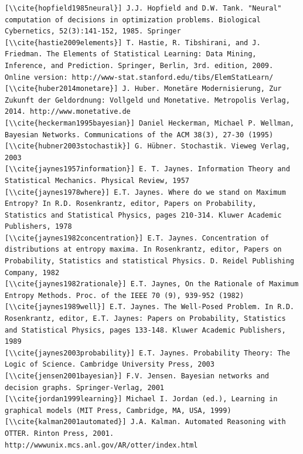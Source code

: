 \documentclass[10pt]{book}
\begin{document}
\begin{verbatim}
[\\cite{hopfield1985neural}] J.J. Hopfield and D.W. Tank. "Neural" computation of decisions in optimization problems. Biological Cybernetics, 52(3):141-152, 1985. Springer
[\\cite{hastie2009elements}] T. Hastie, R. Tibshirani, and J. Friedman. The Elements of Statistical Learning: Data Mining, Inference, and Prediction. Springer, Berlin, 3rd. edition, 2009. Online version: http://www-stat.stanford.edu/tibs/ElemStatLearn/
[\\cite{huber2014monetare}] J. Huber. Monetäre Modernisierung, Zur Zukunft der Geldordnung: Vollgeld und Monetative. Metropolis Verlag, 2014. http://www.monetative.de
[\\cite{heckerman1995bayesian}] Daniel Heckerman, Michael P. Wellman, Bayesian Networks. Communications of the ACM 38(3), 27-30 (1995)
[\\cite{hubner2003stochastik}] G. Hübner. Stochastik. Vieweg Verlag, 2003
[\\cite{jaynes1957information}] E. T. Jaynes. Information Theory and Statistical Mechanics. Physical Review, 1957
[\\cite{jaynes1978where}] E.T. Jaynes. Where do we stand on Maximum Entropy? In R.D. Rosenkrantz, editor, Papers on Probability, Statistics and Statistical Physics, pages 210-314. Kluwer Academic Publishers, 1978
[\\cite{jaynes1982concentration}] E.T. Jaynes. Concentration of distributions at entropy maxima. In Rosenkrantz, editor, Papers on Probability, Statistics and statistical Physics. D. Reidel Publishing Company, 1982
[\\cite{jaynes1982rationale}] E.T. Jaynes, On the Rationale of Maximum Entropy Methods. Proc. of the IEEE 70 (9), 939-952 (1982)
[\\cite{jaynes1989well}] E.T. Jaynes. The Well-Posed Problem. In R.D. Rosenkrantz, editor, E.T. Jaynes: Papers on Probability, Statistics and Statistical Physics, pages 133-148. Kluwer Academic Publishers, 1989
[\\cite{jaynes2003probability}] E.T. Jaynes. Probability Theory: The Logic of Science. Cambridge University Press, 2003
[\\cite{jensen2001bayesian}] F.V. Jensen. Bayesian networks and decision graphs. Springer-Verlag, 2001
[\\cite{jordan1999learning}] Michael I. Jordan (ed.), Learning in graphical models (MIT Press, Cambridge, MA, USA, 1999)
[\\cite{kalman2001automated}] J.A. Kalman. Automated Reasoning with OTTER. Rinton Press, 2001. http://wwwunix.mcs.anl.gov/AR/otter/index.html

\end{verbatim}
\end{document}
